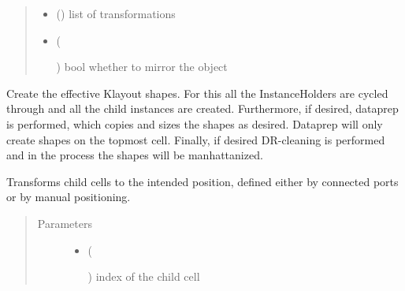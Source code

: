 \documentclass[a4paper,10pt,english]{sphinxmanual}
\begin{document}
\begin{fulllineitems}
\begin{fulllineitems}
\begin{quote}
\begin{description}
\begin{itemize}
\item {} 
 () \textendash{} list of transformations

\item {} 
 (%
\begin{footnote}[59]\sphinxAtStartFootnote
{}
%
\end{footnote}) \textendash{} bool whether to mirror the object

\end{itemize}

\end{description}\end{quote}

\end{fulllineitems}


\begin{fulllineitems}
\label{\detokenize{photonics:kppc.photonics.PhotDevice.produce_impl}}
Create the effective Klayout shapes. For this all the InstanceHolders are cycled through and all the child
instances are created. Furthermore, if desired, dataprep is performed, which copies and sizes the shapes as
desired. Dataprep will only create shapes on the topmost cell. Finally, if desired DR-cleaning is performed and
in the process the shapes will be manhattanized.

\end{fulllineitems}


\begin{fulllineitems}
\label{\detokenize{photonics:kppc.photonics.PhotDevice.set_transformation}}
Transforms child cells to the intended position, defined either by connected ports or by manual
positioning.
\begin{quote}\begin{description}
\item[{Parameters}] \leavevmode\begin{itemize}
\item {} 
 (%
\begin{footnote}[60]\sphinxAtStartFootnote
{}
%
\end{footnote}) \textendash{} index of the child cell


\end{itemize}
\end{description}
\end{quote}
\end{fulllineitems}
\end{fulllineitems}
\end{document}
